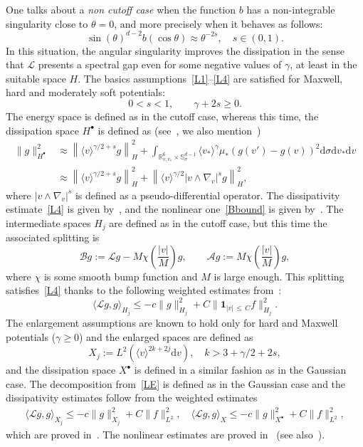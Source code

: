 \documentclass[10pt]{amsart}
\theoremstyle{definition}\newtheorem{defi}[theo]{Definition}\newtheorem{rema}[theo]{Remark}\newtheorem{exam}[theo]{Example}\newtheorem{exem}[theo]{Example}\newtheorem{nota}[theo]{Notation}
\renewcommand{\d}{\mathrm{d}}
\newcommand{\Burin}{\mathbf{1}}
\newcommand{\R}{\mathbb{R}}
\renewcommand{\S}{\mathbb{S}}
\renewcommand{\AA}{\mathcal{A}}
\newcommand{\BB}{\mathcal{B}}
\newcommand{\LL}{\mathcal{L}}
\newcommand{\Ss}{H}
\newcommand{\Ssp}{H^{\bullet}}
\newcommand{\Sl}{X}
\newcommand{\Slp}{X^{\bullet}}
\renewcommand*\le{\leqslant}
\renewcommand*\ge{\geqslant}
\newcommand{\la}{\langle}
\newcommand{\ra}{\rangle}
\begin{document}
One talks about a \emph{non cutoff case} when the function $b$ has a non-integrable singularity close to $\theta = 0$, and more precisely when it behaves as follows:
\[
\sin (\theta)^{d-2} b(\cos \theta) \approx \theta^{-2 s}, \quad s \in (0, 1).
\]
In this situation, the angular singularity improves the dissipation in the sense that $\LL$ presents a spectral gap even for some negative values of $\gamma$, at least in the suitable space $\Ss$. The basics assumptions~\eqref{L1}--\eqref{L4} are satisfied for Maxwell, hard and moderately soft potentials:
\[
0 < s < 1, \qquad \gamma + 2 s \ge 0.
\]
The energy space is defined as in the cutoff case, whereas this time, the dissipation space $\Ssp$ is defined as (see~\cite{AHL2019,AMUXY2011}, we also mention~\cite{GS2011})
\begin{align*}
\| g \|^2_{\Ssp} & \approx \left\| \la v \ra^{\gamma/2 + s} g \right\|_{\Ss}^2 + \int_{\R^6_{v, v_*} \times \S^{d-1}_\sigma } \la v_* \ra^{\gamma} \mu_* \left(g(v') - g(v) \right)^2 \d \sigma \d v_* \d v \\
& \approx \left\| \la v \ra^{\gamma/2 + s} g \right\|_{\Ss}^2 + \left\| \la v \ra^{\gamma/2} | v \land \nabla_v |^s g \right\|^2_{\Ss},
\end{align*}
where $| v \land \nabla_v |^s$ is defined as a pseudo-differential operator. The dissipativity estimate~\ref{L4} is given by~\cite[Lemma~2.6]{AMUXY2011}, and the nonlinear one~\eqref{Bbound} is given by~\cite[Theorem~2.1]{GS2011}. The intermediate spaces $\Ss_j$ are defined as in the cutoff case, but this time the associated splitting is
\[
\BB g := \LL g- M \chi\left(\frac{|v|}{M} \right) g, \qquad \AA g := M \chi\left(\frac{|v|}{M} \right) g,
\]
where $\chi$ is some smooth bump function and $M$ is large enough. This splitting satisfies~\eqref{L4} thanks to the following weighted estimates from~\cite[Lemmas~2.4-2.5]{GS2011}:
\[
\la \LL g, g \ra_{\Ss_j} \le - c \| g \|^2_{\Ss_j} + C \| \Burin_{|v|\,\le\,C} f \|_{\Ss_j}^2.
\]
The enlargement assumptions are known to hold only for hard and Maxwell potentials ($\gamma \ge 0$) and the enlarged spaces are defined as
\[
\Sl_j := L^2\left(\la v \ra^{2k+2j} \d v \right), \quad k > 3 + \gamma/2 + 2 s,
\]
and the dissipation space $\Slp$ is defined in a similar fashion as in the Gaussian case. The decomposition from~\eqref{LE} is defined as in the Gaussian case and the dissipativity estimates follow from the weighted estimates
\begin{gather*}
\la \LL g, g \ra_{\Sl_j} \le - c \| g \|^2_{\Sl_j} + C \| f \|_{L^2}^2,
\quad \la \LL g, g \ra_{\Sl} \le - c \| g \|^2_{\Slp} + C \| f \|_{L^2}^2,
\end{gather*}
which are proved in~\cite[Lemma~4.2]{HTT2020}. The nonlinear estimates are proved in~\cite[Lemma~2.12]{CDL2022} (see also~\cite{AMSY2021,HTT2020}).
\end{document}
